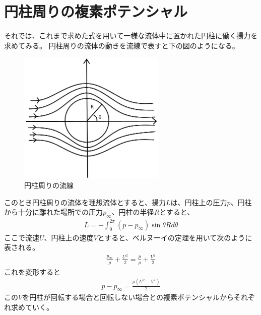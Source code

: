 \documentclass[10pt,b5paper,papersize,dvipdfmx]{jsbook}
\begin{document}
\section{円柱周りの複素ポテンシャル}
それでは、これまで求めた式を用いて一様な流体中に置かれた円柱に働く揚力を求めてみる。  円柱周りの流体の動きを流線で表すと下の図のようになる。
\begin{figure}[ht]
  \centering
  \includegraphics[width=70mm]{img/ryuutai1.png}
  \caption{円柱周りの流線}
\end{figure}
\par
このとき円柱周りの流体を理想流体とすると、揚力$L$は、円柱上の圧力$p$、円柱から十分に離れた場所での圧力$p_\infty$、円柱の半径$R$とすると、
\begin{align}
  L = -\int_0^{2\pi}(p-p_\infty)\sin\theta Rd\theta
\end{align}
ここで流速$U$、円柱上の速度$V$とすると、ベルヌーイの定理を用いて次のように表される。
\begin{align}
  \frac{p_\infty}{\rho} + \frac{U^2}{2} = \frac{p}{\rho} + \frac{V^2}{2}
\end{align}
これを変形すると
\begin{align}
  p-p_\infty = \frac{\rho(U^2-V^2)}{2}
  \label{eq:9}
\end{align}
この$V$を円柱が回転する場合と回転しない場合との複素ポテンシャルからそれぞれ求めていく。
\end{document}
